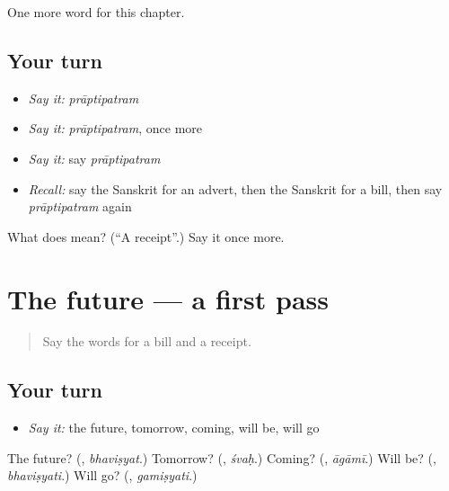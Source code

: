 \begin{grammarlens}[title={What you've built}]
One more word for this chapter.
\end{grammarlens}

\subsection*{Your turn}
\begin{itemize}
\raggedright
  \item \emph{Say it:} \emph{prāptipatram}
  \item \emph{Say it:} \emph{prāptipatram}, once more
  \item \emph{Say it:} say \emph{prāptipatram}
  \item \emph{Recall:} say the Sanskrit for an advert, then the Sanskrit for a bill, then say \emph{prāptipatram} again
\end{itemize}

\begin{tcolorbox}[breakable,colback=teal!4,colframe=teal!35!black,title={Before you move on}]
What does  mean? (\textquotedblleft{}A receipt\textquotedblright{}.) Say it once more.
\end{tcolorbox}
\section[(dialogue)]{The future — a first pass}

\label{lesson:SA-R140-first-pass-the-future}



\begin{quote}
Say the words for a bill and a receipt.
\end{quote}

\subsection*{Your turn}
\begin{itemize}
\raggedright
  \item \emph{Say it:} the future, tomorrow, coming, will be, will go
\end{itemize}

\begin{tcolorbox}[breakable,colback=teal!4,colframe=teal!35!black,title={Before you move on}]
The future? (\textbf{}, \emph{bhaviṣyat}.) Tomorrow? (\textbf{}, \emph{śvaḥ}.) Coming? (\textbf{}, \emph{āgāmī}.) Will be? (\textbf{}, \emph{bhaviṣyati}.) Will go? (\textbf{}, \emph{gamiṣyati}.)
\end{tcolorbox}
